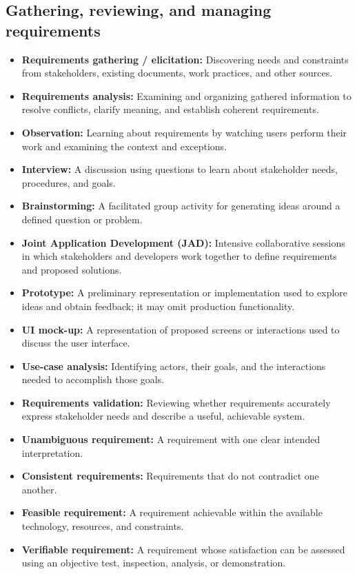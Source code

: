 \documentclass[11pt]{article}
\newenvironment{DottedList}{%
  \begin{itemize}[leftmargin=2em, itemsep=0.35em, topsep=0.35em, label=\textbullet]
}{%
  \end{itemize}
}
\begin{document}
\subsection*{Gathering, reviewing, and managing requirements}
\begin{DottedList}
  \item \textbf{Requirements gathering / elicitation:} Discovering needs and constraints from stakeholders, existing documents, work practices, and other sources.
  \item \textbf{Requirements analysis:} Examining and organizing gathered information to resolve conflicts, clarify meaning, and establish coherent requirements.
  \item \textbf{Observation:} Learning about requirements by watching users perform their work and examining the context and exceptions.
  \item \textbf{Interview:} A discussion using questions to learn about stakeholder needs, procedures, and goals.
  \item \textbf{Brainstorming:} A facilitated group activity for generating ideas around a defined question or problem.
  \item \textbf{Joint Application Development (JAD):} Intensive collaborative sessions in which stakeholders and developers work together to define requirements and proposed solutions.
  \item \textbf{Prototype:} A preliminary representation or implementation used to explore ideas and obtain feedback; it may omit production functionality.
  \item \textbf{UI mock-up:} A representation of proposed screens or interactions used to discuss the user interface.
  \item \textbf{Use-case analysis:} Identifying actors, their goals, and the interactions needed to accomplish those goals.
  \item \textbf{Requirements validation:} Reviewing whether requirements accurately express stakeholder needs and describe a useful, achievable system.
  \item \textbf{Unambiguous requirement:} A requirement with one clear intended interpretation.
  \item \textbf{Consistent requirements:} Requirements that do not contradict one another.
  \item \textbf{Feasible requirement:} A requirement achievable within the available technology, resources, and constraints.
  \item \textbf{Verifiable requirement:} A requirement whose satisfaction can be assessed using an objective test, inspection, analysis, or demonstration.

\end{DottedList}
\end{document}
